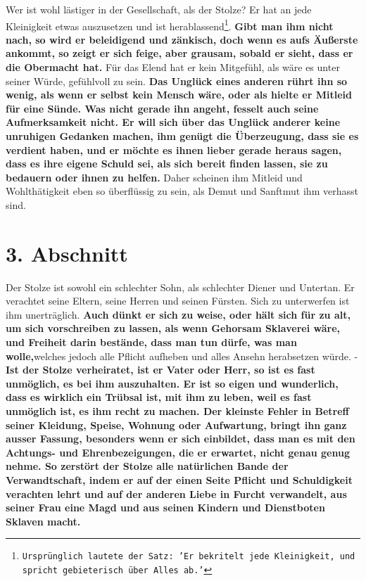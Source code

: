 Wer ist wohl lästiger in der Gesellschaft, als der Stolze?
Er hat an jede Kleinigkeit etwas auszusetzen und ist herablassend\footnote{\texttt{Ursprünglich lautete der Satz: 'Er bekritelt jede Kleinigkeit, und spricht gebieterisch über Alles ab.'}}.
\label{ref:12_02_eitle_menschen_streit}
\textbf{Gibt man ihm nicht nach,
so wird er beleidigend und zänkisch, doch wenn es aufs Äußerste ankommt, so zeigt
er sich feige, aber grausam, sobald er sieht, dass er die
Obermacht hat.} Für das
Elend hat er kein Mitgefühl, als wäre es unter seiner
Würde, gefühlvoll zu sein. \label{ref:12_02_eitle_menschen_mitgefuehl}
\textbf{Das Unglück eines anderen rührt ihn so wenig, als wenn er selbst kein
Mensch
wäre, oder als hielte er Mitleid für eine Sünde. Was nicht gerade
ihn angeht,
fesselt auch seine Aufmerksamkeit nicht. Er will sich über das Unglück anderer
keine unruhigen Gedanken machen, ihm genügt die  Überzeugung, dass sie es
verdient haben, und er möchte es ihnen lieber gerade heraus sagen, dass es ihre
eigene Schuld sei, als sich bereit finden lassen, sie zu bedauern
oder ihnen zu
helfen.} Daher scheinen ihm Mitleid und Wohlthätigkeit eben so
überflüssig zu
sein, als Demut und Sanftmut ihm verhasst sind.

\section{3. Abschnitt} \label{kap12_ab3}

Der Stolze ist sowohl ein schlechter Sohn, als schlechter
Diener und Untertan.
Er verachtet seine Eltern, seine Herren und seinen Fürsten. Sich
zu unterwerfen
ist ihm unerträglich. \label{ref:12_03_eitle_menschen_ehe}
\textbf{Auch dünkt er sich zu weise, oder hält sich für zu alt, um
sich vorschreiben zu lassen, als wenn Gehorsam Sklaverei
 wäre,
und Freiheit
darin bestände, dass man tun dürfe, was man wolle,}welches jedoch alle Pflicht
aufheben und alles Ansehn herabsetzen würde. - \textbf{Ist der Stolze
verheiratet, ist
er Vater oder Herr, so ist es fast unmöglich, es bei ihm auszuhalten. Er ist so
eigen und wunderlich, dass es wirklich ein Trübsal ist, mit ihm zu leben, weil
es fast unmöglich ist, es ihm recht zu machen. Der kleinste Fehler in Betreff
seiner Kleidung, Speise, Wohnung oder Aufwartung, bringt ihn ganz ausser Fassung,
besonders wenn er sich einbildet, dass man es mit den Achtungs- und
Ehrenbezeigungen, die er erwartet, nicht genau genug nehme. So zerstört der
Stolze alle natürlichen Bande der Verwandtschaft, indem er
auf der einen Seite
Pflicht und Schuldigkeit verachten lehrt und auf der anderen
Liebe in Furcht
verwandelt, aus seiner Frau eine Magd und aus seinen
Kindern und Dienstboten
Sklaven macht.}

